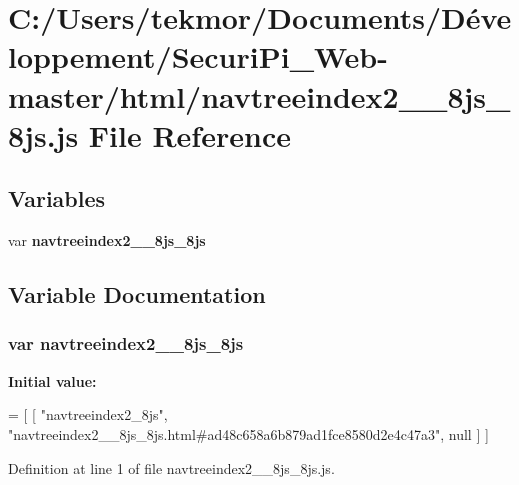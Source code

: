 \section{C\+:/\+Users/tekmor/\+Documents/\+Développement/\+Securi\+Pi\+\_\+\+Web-\/master/html/navtreeindex2\+\_\+\+\_\+8js\+\_\+8js.js File Reference}
\label{navtreeindex2____8js__8js_8js}
\subsection*{Variables}
\begin{DoxyCompactItemize}
\item 
var {\bf navtreeindex2\+\_\+\+\_\+8js\+\_\+8js}
\end{DoxyCompactItemize}


\subsection{Variable Documentation}
\subsubsection[{navtreeindex2\+\_\+\+\_\+8js\+\_\+8js}]{\setlength{\rightskip}{0pt plus 5cm}var navtreeindex2\+\_\+\+\_\+8js\+\_\+8js}\label{navtreeindex2____8js__8js_8js_a8faf7fdd50ae861ef7ae26079bdc0972}
{\bfseries Initial value\+:}
\begin{DoxyCode}
=
[
    [ \textcolor{stringliteral}{"navtreeindex2\_8js"}, \textcolor{stringliteral}{"navtreeindex2\_\_8js\_8js.html#ad48c658a6b879ad1fce8580d2e4c47a3"}, null ]
]
\end{DoxyCode}


Definition at line 1 of file navtreeindex2\+\_\+\+\_\+8js\+\_\+8js.\+js.

